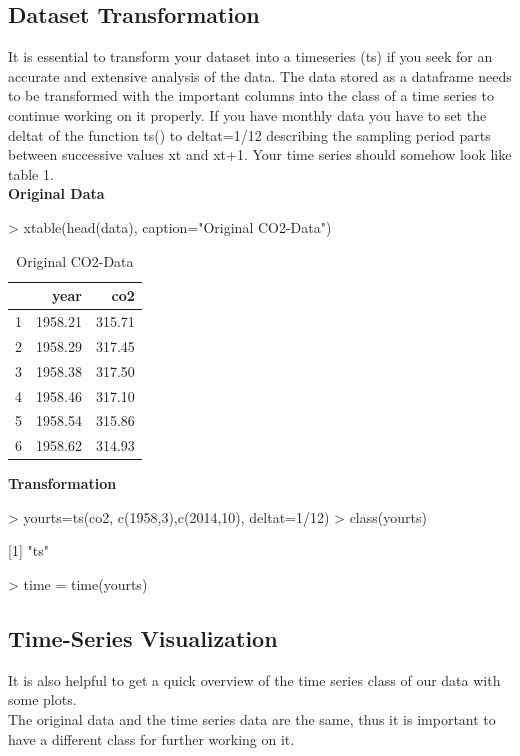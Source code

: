 \documentclass[11pt, a4paper]{article} %
\begin{document}
\subsection{Dataset Transformation}
It is essential to transform your dataset into a timeseries (ts) if you seek for an accurate and extensive analysis of the data.
\noindent The data stored as a dataframe needs to be transformed with the important columns into the class of a time series to continue working on it properly. If you have monthly data you have to set the deltat of the function ts() to deltat=1/12 describing the sampling period parts between successive values xt and xt+1. Your time series should somehow look like table 1.\\
\noindent \textbf{Original Data}\\
\begin{Schunk}
\begin{Sinput}
> xtable(head(data), caption="Original CO2-Data")
\end{Sinput}
\begin{table}[ht]
\centering
\begin{tabular}{rrr}
  \hline
 & year & co2 \\ 
  \hline
1 & 1958.21 & 315.71 \\ 
  2 & 1958.29 & 317.45 \\ 
  3 & 1958.38 & 317.50 \\ 
  4 & 1958.46 & 317.10 \\ 
  5 & 1958.54 & 315.86 \\ 
  6 & 1958.62 & 314.93 \\ 
   \hline
\end{tabular}
\caption{Original CO2-Data} 
\end{table}\end{Schunk}
\noindent \textbf{Transformation}\\
\begin{Schunk}
\begin{Sinput}
> yourts=ts(co2, c(1958,3),c(2014,10), deltat=1/12)
> class(yourts)
\end{Sinput}
[1] "ts"\begin{Sinput}
> time = time(yourts)
\end{Sinput}
\end{Schunk}

\subsection{Time-Series Visualization}%
It is  also helpful to get a quick overview of the time series class of our data with some plots.\\ 
The original data and the time series data are the same, thus it is important to have a different class for further working on it. \\
\end{document}
